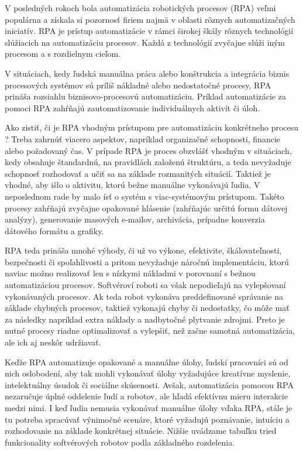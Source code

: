 \documentclass[twoside,slovak, a4paper]{article}
\begin{document}
V posledných rokoch bola automatizácia robotických procesov (RPA) veľmi populárna a získala si pozornosť firiem najmä v oblasti rôznych automatizačných iniciatív. RPA je prístup automatizácie v rámci širokej škály rôznych technológií slúžiacich na automatizáciu procesov. Každá z technológií zvyčajne slúži iným procesom a s rozdielnym cieľom.\cite{Hofmann2020}

V situáciach, kedy ľudská manuálna práca alebo konštrukcia a integrácia biznis procesových systémov sú príliš nákladné alebo nedostatočné procesy, RPA prináša rozsiahlu biznisovo-procesovú automatizáciu. Príklad automatizácie za pomoci RPA zahŕňajú zautomatizovanie individuálnych aktivít či úloh.\cite{Hofmann2020}

Ako zistiť, či je RPA vhodným prístupom pre automatizáciu konkrétneho procesu ? Treba zahrnúť viacero aspektov, napríklad organizačné schopnosti, financie alebo požadovaný čas. V prípade RPA je proces obzvlášť vhodným v situáciach, kedy obsahuje štandardnú, na pravidlách založenú štruktúru, a teda nevyžaduje schopnosť rozhodovať a učiť sa na základe rozmanitých situácií. Taktiež je vhodné, aby išlo o aktivitu, ktorú bežne manuálne vykonávajú ľudia. V neposlednom rade by malo ísť o systém s viac-systémovým prístupom. Takéto procesy zahŕňajú zvyčajne opakované hlásenie (zahŕňajúc určitú formu dátovej analýzy), generovanie masových e-mailov, archivácia, prípadne konverzia dátového formátu a grafiky.\cite{Hofmann2020}

RPA teda prináša mnohé výhody, či už vo výkone, efektivite, škálovateľnosti, bezpečnosti či spoľahlivosti a pritom nevyžaduje náročnú implementáciu, ktorú naviac možno realizovať len s nízkymi nákladmi v porovnaní s bežnou automatizáciou procesov. Softvéroví roboti sa však nepodieľajú na vylepšovaní vykonávaných procesov. Ak teda robot vykonáva preddefinované správanie na základe chybných procesov, taktiež vykonajú chyby či nedostatky, čo môže mať za následky napríklad extra náklady a nadbytočné plytvanie zdrojmi. Preto je nutné procesy riadne optimalizovať a vylepšiť, než začne samotná automatizácia, ale ich aj neskôr udržiavať.\cite{Hofmann2020}

Keďže RPA automatizuje opakované a manuálne úlohy, ľudskí pracovníci sú od nich oslobodení, aby tak mohli vykonávať úlohy vyžadujúce  kreatívne myslenie, intelektuálny úsudok či sociálne skúsenosti. Avšak, automatizácia pomocou RPA nezaručuje úplné oddelenie ľudí a robotov, ale hľadá efektívnu mieru interakcie medzi nimi. I keď ľudia nemusia vykonávať manuálne úlohy vďaka RPA, stále je tu potreba spracúvať výnimočné scenáre, ktoré vyžadujú poznávanie, intuíciu a rozhodovanie na základe konkrétnej situácie.\cite{Hofmann2020} Nižšie uvádzame tabuľku tried funkcionality softvérových robotov podla základného rozdelenia.
\end{document}
